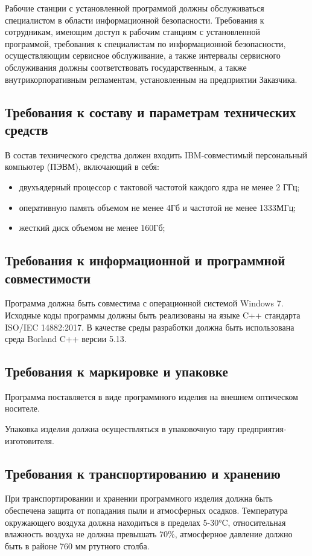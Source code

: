 Рабочие станции с установленной программой должны обслуживаться специалистом в области информационной безопасности. Требования к сотрудникам, имеющим доступ к рабочим станциям с установленной программой, требования к специалистам по информационной безопасности, осуществляющим сервисное обслуживание, а также интервалы сервисного обслуживания должны соответствовать государственным, а также внутрикорпоративным регламентам, установленным на предприятии Заказчика.

\subsection{Требования к составу и параметрам технических средств}

В состав технического средства должен входить IBM-совместимый персональный компьютер (ПЭВМ), включающий в себя:
\begin{itemize}
	\item двухъядерный процессор с тактовой частотой каждого ядра не менее 2 ГГц; 
	\item оперативную память объемом не менее 4Гб и частотой не менее 1333МГц;
	\item жесткий диск объемом не менее 160Гб;
\end{itemize}

\subsection{Требования к информационной и программной совместимости}

Программа должна быть совместима с операционной системой Windows 7.
Исходные коды программы должны быть реализованы на языке C++ стандарта ISO/IEC 14882:2017.
В качестве среды разработки должна быть использована среда Borland C++ версии 5.13.

\subsection{Требования к маркировке и упаковке}

Программа поставляется в виде программного изделия на внешнем оптическом носителе.

Упаковка изделия должна осуществляться в упаковочную тару предприятия-изготовителя.

\subsection{Требования к транспортированию и хранению}

При транспортировании и хранении программного изделия должна быть обеспечена защита от попадания пыли и атмосферных осадков.
Температура окружающего воздуха должна находиться в пределах 5-30°C, относительная влажность воздуха не должна превышать 70\%, атмосферное давление должно быть в районе 760 мм ртутного столба.